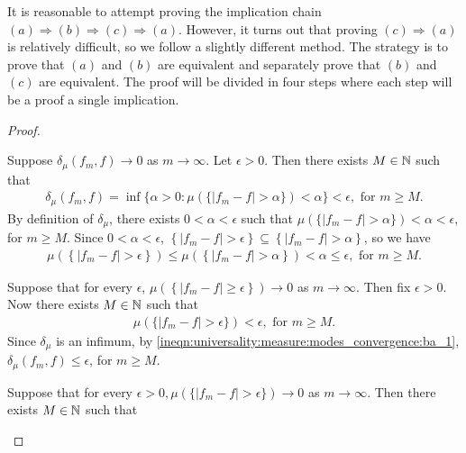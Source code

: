 \begin{proof-idea*}
It is reasonable to attempt proving the implication chain $(a) \Longrightarrow (b) \Longrightarrow (c) \Longrightarrow (a)$.
However, it turns out that proving $(c) \Longrightarrow (a)$ is relatively difficult, so we follow a slightly different method.
The strategy is to prove that $(a)$ and $(b)$ are equivalent and separately prove that $(b)$ and $(c)$ are equivalent. The proof will be divided in four steps where each step will be a proof a single implication.
\end{proof-idea*}
\begin{proof}
\setcounter{step}{0}
\begin{step}[$a \Longrightarrow b$]
Suppose $\delta_\mu (f_m, f) \to 0$ as $m \to \infty$. Let $\epsilon > 0$. Then there exists $M \in {\mathbb N}$ such that 
\begin{align}
     \label{ineqn:universality:measure:modes_convergence:ab_1}
     \delta_\mu (f_m, f) = \inf \{ \alpha > 0 : \mu(\{ |f_m - f| > \alpha\}) < \alpha \} < \epsilon, \text{ for $m \geq M$.} 
\end{align}
By definition of $\delta_\mu$, there exists $0 < \alpha < \epsilon$ such that $\mu(\{ |f_m - f| > \alpha\}) < \alpha < \epsilon$,
for $m \geq M$. Since $0 < \alpha < \epsilon$, $\left \{ |f_m - f| > \epsilon  \right \} \subseteq \left \{ |f_m - f| > \alpha \right \}$, so we have 
\begin{align*}
    \mu (\left \{ |f_m - f| > \epsilon  \right \} ) \leq \mu(\left \{ |f_m - f| > \alpha  \right \}) < \alpha \leq \epsilon, \text{ for $m \geq M$.}
\end{align*}
\end{step}
\begin{step}[$b \Longrightarrow a$]
Suppose that for every $\epsilon$, $ \mu (\left \{ |f_m - f| \geq \epsilon  \right \} ) \to 0 $ as $m \to \infty$. Then fix $\epsilon > 0$. Now there exists $M \in {\mathbb N}$ such that 
\begin{align}
     \label{ineqn:universality:measure:modes_convergence:ba_1}
     \mu (\{ | f_m - f | > \epsilon \}) < \epsilon, \text{ for $m \geq M$.} 
\end{align}
Since $\delta_\mu$ is an infimum, by \ref{ineqn:universality:measure:modes_convergence:ba_1}, $\delta_\mu(f_m, f) \leq \epsilon$, for $m \geq M$.
\end{step}
\begin{step}[$b \Longrightarrow c$]
Suppose that for every $\epsilon > 0, \mu (\{ | f_m - f | > \epsilon \}) \to 0$ as $m \to \infty$. Then there exists $M \in {\mathbb N}$ such that

\end{step}
\end{proof}
